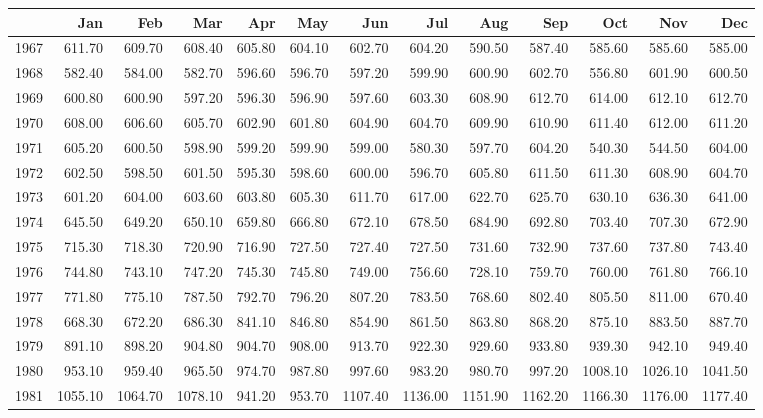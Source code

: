 \begin{longtable}{rrrrrrrrrrrrr}
  \hline
 & Jan & Feb & Mar & Apr & May & Jun & Jul & Aug & Sep & Oct & Nov & Dec \\ 
  \hline
1967 & 611.70 & 609.70 & 608.40 & 605.80 & 604.10 & 602.70 & 604.20 & 590.50 & 587.40 & 585.60 & 585.60 & 585.00 \\ 
  1968 & 582.40 & 584.00 & 582.70 & 596.60 & 596.70 & 597.20 & 599.90 & 600.90 & 602.70 & 556.80 & 601.90 & 600.50 \\ 
  1969 & 600.80 & 600.90 & 597.20 & 596.30 & 596.90 & 597.60 & 603.30 & 608.90 & 612.70 & 614.00 & 612.10 & 612.70 \\ 
  1970 & 608.00 & 606.60 & 605.70 & 602.90 & 601.80 & 604.90 & 604.70 & 609.90 & 610.90 & 611.40 & 612.00 & 611.20 \\ 
  1971 & 605.20 & 600.50 & 598.90 & 599.20 & 599.90 & 599.00 & 580.30 & 597.70 & 604.20 & 540.30 & 544.50 & 604.00 \\ 
  1972 & 602.50 & 598.50 & 601.50 & 595.30 & 598.60 & 600.00 & 596.70 & 605.80 & 611.50 & 611.30 & 608.90 & 604.70 \\ 
  1973 & 601.20 & 604.00 & 603.60 & 603.80 & 605.30 & 611.70 & 617.00 & 622.70 & 625.70 & 630.10 & 636.30 & 641.00 \\ 
  1974 & 645.50 & 649.20 & 650.10 & 659.80 & 666.80 & 672.10 & 678.50 & 684.90 & 692.80 & 703.40 & 707.30 & 672.90 \\ 
  1975 & 715.30 & 718.30 & 720.90 & 716.90 & 727.50 & 727.40 & 727.50 & 731.60 & 732.90 & 737.60 & 737.80 & 743.40 \\ 
  1976 & 744.80 & 743.10 & 747.20 & 745.30 & 745.80 & 749.00 & 756.60 & 728.10 & 759.70 & 760.00 & 761.80 & 766.10 \\ 
  1977 & 771.80 & 775.10 & 787.50 & 792.70 & 796.20 & 807.20 & 783.50 & 768.60 & 802.40 & 805.50 & 811.00 & 670.40 \\ 
  1978 & 668.30 & 672.20 & 686.30 & 841.10 & 846.80 & 854.90 & 861.50 & 863.80 & 868.20 & 875.10 & 883.50 & 887.70 \\ 
  1979 & 891.10 & 898.20 & 904.80 & 904.70 & 908.00 & 913.70 & 922.30 & 929.60 & 933.80 & 939.30 & 942.10 & 949.40 \\ 
  1980 & 953.10 & 959.40 & 965.50 & 974.70 & 987.80 & 997.60 & 983.20 & 980.70 & 997.20 & 1008.10 & 1026.10 & 1041.50 \\ 
  1981 & 1055.10 & 1064.70 & 1078.10 & 941.20 & 953.70 & 1107.40 & 1136.00 & 1151.90 & 1162.20 & 1166.30 & 1176.00 & 1177.40 \\ 

\end{longtable}
